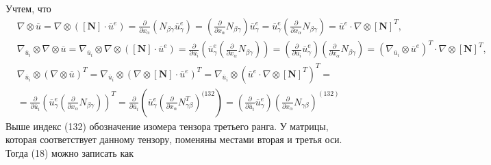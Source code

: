 \documentclass[a4paper,12pt]{article}
\begin{document}
Учтем, что 
\begin{equation}
\begin{split}
    &\nabla \otimes \overline{u} = \nabla \otimes ([\textbf{N}] \cdot \overline{u}^e) = \frac{\partial}{\partial x_\alpha}( N_{\beta \gamma} \overline{u}^e_\gamma) = (\frac{\partial}{\partial x_\alpha} N_{\beta \gamma}) \overline{u}^e_\gamma  = \overline{u}^e_\gamma (\frac{\partial}{\partial x_\alpha}N_{\beta \gamma}) = \overline{u}^e  \cdot \nabla \otimes [\textbf{N}]^T, \\
    &\nabla_{\overline{u}_i} \otimes \nabla \otimes \overline{u}  = \nabla_{\overline{u}_i} \otimes \nabla \otimes ([\textbf{N}] \cdot \overline{u}^e) = \frac{\partial}{\partial \overline{u}_i} (\overline{u}^e_\gamma (\frac{\partial}{\partial x_\alpha} N_{\beta \gamma})) = (\frac{\partial}{\partial \overline{u}_i} \overline{u}^e_\gamma )(\frac{\partial}{\partial x_\alpha} N_{\beta \gamma}) = (\nabla_{\overline{u}_i} \otimes \overline{u}^e)^T \cdot \nabla \otimes [\textbf{N}]^T,   \\
    &\nabla_{\overline{u}_i} \otimes (\nabla \otimes \overline{u})^T = \nabla_{\overline{u}_i} \otimes (\nabla \otimes [\textbf{N}] \cdot \overline{u}^e)^T = \nabla_{\overline{u}_i} \otimes( \overline{u}^e  \cdot \nabla \otimes [\textbf{N}]^T)^T = \\
    & = \frac{\partial}{\partial \overline{u}_i} (\overline{u}^e_\gamma (\frac{\partial}{\partial x_\alpha} N_{\beta \gamma}))^T = \frac{\partial}{\partial \overline{u}_i} (\overline{u}^e_\gamma (\frac{\partial}{\partial x_\alpha} N^T_{\gamma \beta})^{(132}) = (\frac{\partial}{\partial \overline{u}_i} \overline{u}^e_\gamma )(\frac{\partial}{\partial x_\alpha} N_{\gamma \beta})^{(132)} 
\end{split}
\end{equation}
Выше индекс (132) обозначение изомера тензора третьего ранга. У матрицы, которая соответствует данному тензору, поменяны местами вторая и третья оси.
Тогда (18) можно записать как
\end{document}
